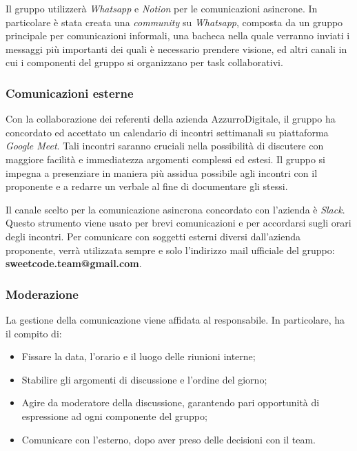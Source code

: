 \documentclass[10pt, a4paper]{article}
\begin{document}
Il gruppo utilizzerà \textit{Whatsapp} e \textit{Notion} per le comunicazioni asincrone. In particolare è stata creata una \textit{community} su \textit{Whatsapp}, composta da un gruppo principale per comunicazioni informali, una bacheca nella quale verranno inviati i messaggi più importanti dei quali è necessario prendere visione, ed altri canali in cui i componenti del gruppo si organizzano per task collaborativi.

\subsubsection{Comunicazioni esterne}

Con la collaborazione dei referenti della azienda AzzurroDigitale, il gruppo ha concordato ed accettato un calendario di incontri settimanali su piattaforma \textit{Google Meet}. Tali incontri saranno cruciali nella possibilità di discutere con maggiore facilità e immediatezza argomenti complessi ed estesi. Il gruppo si impegna a presenziare in maniera più assidua possibile agli incontri con il proponente e a redarre un verbale al fine di documentare gli stessi.

Il canale scelto per la comunicazione asincrona concordato con l'azienda è \textit{Slack}. Questo strumento viene usato per brevi comunicazioni e per accordarsi sugli orari degli incontri.
Per comunicare con soggetti esterni diversi dall'azienda proponente, verrà utilizzata sempre e solo l'indirizzo mail ufficiale del gruppo: \textbf{sweetcode.team@gmail.com}.

\subsubsection{Moderazione}
La gestione della comunicazione viene affidata al responsabile. In particolare, ha il compito di:
\begin{itemize}
    \item Fissare la data, l'orario e il luogo delle riunioni interne;
    \item Stabilire gli argomenti di discussione e l'ordine del giorno;
    \item Agire da moderatore della discussione, garantendo pari opportunità di espressione ad ogni componente del gruppo;
    \item Comunicare con l'esterno, dopo aver preso delle decisioni con il team. 
\end{itemize}
\end{document}
